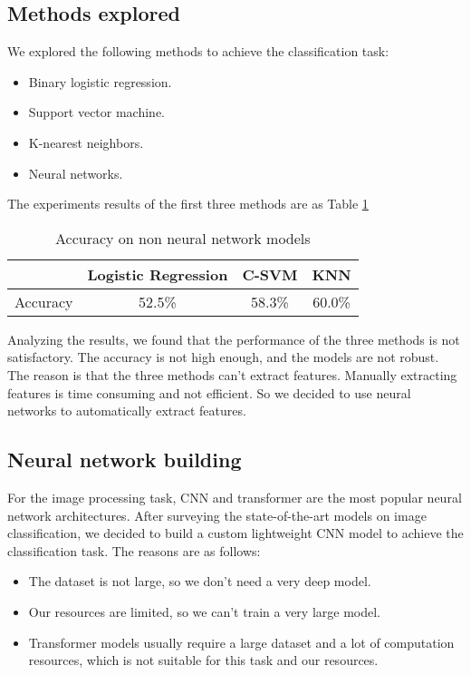 \documentclass[12pt]{article}
\begin{document}
\subsection{Methods explored}

We explored the following methods to achieve the classification task:
\begin{itemize}
\item Binary logistic regression.
\item Support vector machine.
\item K-nearest neighbors.
\item Neural networks.
\end{itemize}

The experiments results of the first three methods are as Table \ref{tb1}

\begin{table}[h]
    \centering
    \begin{tabular}{|c|c|c|c|}
        \hline
         & Logistic Regression & C-SVM & KNN \\
        \hline
        Accuracy & 52.5\% & 58.3\% & 60.0\% \\
        \hline
    \end{tabular}
    \caption{Accuracy on non neural network models}
    \label{tb1}
\end{table}

Analyzing the results, we found that the performance of the three methods is not satisfactory. The accuracy is not high enough, and the models are not robust. The reason is that the three methods can't extract features. Manually extracting features is time consuming and not efficient. So we decided to use neural networks to automatically extract features.

\subsection{Neural network building}

For the image processing task, CNN and transformer are the most popular neural network architectures. After surveying the state-of-the-art models on image classification, we decided to build a custom lightweight CNN model to achieve the classification task. The reasons are as follows:

\begin{itemize}
\item The dataset is not large, so we don't need a very deep model.
\item Our resources are limited, so we can't train a very large model.
\item Transformer models usually require a large dataset and a lot of computation resources, which is not suitable for this task and our resources.
\end{itemize}
\end{document}
